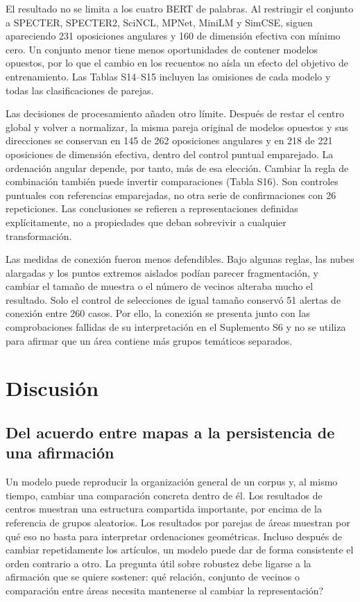 \documentclass[12pt]{article}
\begin{document}
El resultado no se limita a los cuatro BERT de palabras. Al restringir el conjunto a SPECTER, SPECTER2, SciNCL, MPNet, MiniLM y SimCSE, siguen apareciendo 231 oposiciones angulares y 160 de dimensión efectiva con mínimo cero. Un conjunto menor tiene menos oportunidades de contener modelos opuestos, por lo que el cambio en los recuentos no aísla un efecto del objetivo de entrenamiento. Las Tablas S14--S15 incluyen las omisiones de cada modelo y todas las clasificaciones de parejas.

Las decisiones de procesamiento añaden otro límite. Después de restar el centro global y volver a normalizar, la misma pareja original de modelos opuestos y sus direcciones se conservan en 145 de 262 oposiciones angulares y en 218 de 221 oposiciones de dimensión efectiva, dentro del control puntual emparejado. La ordenación angular depende, por tanto, más de esa elección. Cambiar la regla de combinación también puede invertir comparaciones (Tabla S16). Son controles puntuales con referencias emparejadas, no otra serie de confirmaciones con 26 repeticiones. Las conclusiones se refieren a representaciones definidas explícitamente, no a propiedades que deban sobrevivir a cualquier transformación.

Las medidas de conexión fueron menos defendibles. Bajo algunas reglas, las nubes alargadas y los puntos extremos aislados podían parecer fragmentación, y cambiar el tamaño de muestra o el número de vecinos alteraba mucho el resultado. Solo el control de selecciones de igual tamaño conservó 51 alertas de conexión entre 260 casos. Por ello, la conexión se presenta junto con las comprobaciones fallidas de su interpretación en el Suplemento S6 y no se utiliza para afirmar que un área contiene más grupos temáticos separados.

\section{Discusión}
\subsection{Del acuerdo entre mapas a la persistencia de una afirmación}
Un modelo puede reproducir la organización general de un corpus y, al mismo tiempo, cambiar una comparación concreta dentro de él. Los resultados de centros muestran una estructura compartida importante, por encima de la referencia de grupos aleatorios. Los resultados por parejas de áreas muestran por qué eso no basta para interpretar ordenaciones geométricas. Incluso después de cambiar repetidamente los artículos, un modelo puede dar de forma consistente el orden contrario a otro. La pregunta útil sobre robustez debe ligarse a la afirmación que se quiere sostener: \textquestiondown{}qué relación, conjunto de vecinos o comparación entre áreas necesita mantenerse al cambiar la representación?
\end{document}
